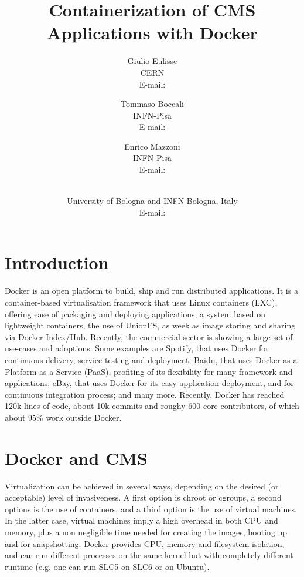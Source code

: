 \documentclass{PoS}
\title{Containerization of CMS Applications with Docker}
\author{Giulio Eulisse\\
        CERN\\
        E-mail: \email{Giulio.Eulisse@cern.ch}}
\author{Tommaso Boccali\\
        INFN-Pisa\\
        E-mail: \email{Tommaso.Boccali@pi.infn.it}}
\author{Enrico Mazzoni\\
        INFN-Pisa\\
        E-mail: \email{enrico.mazzoni@pi.infn.it}}
\author{\speaker{Daniele Bonacorsi}\\
        University of Bologna and INFN-Bologna, Italy\\
        E-mail: \email{daniele.bonacorsi@unibo.it}}
\begin{document}
\section{Introduction}

Docker is an open platform to build, ship and run distributed applications. It is a container-based virtualisation framework that uses Linux containers (LXC), offering ease of packaging and deploying applications, a system based on lightweight containers, the use of UnionFS, as week as image storing and sharing via Docker Index/Hub. Recently, the commercial sector is showing a large set of use-cases and adoptions. Some examples are Spotify, that uses Docker for continuous delivery, service testing and deployment; Baidu, that uses Docker as a Platform-as-a-Service (PaaS), profiting of its flexibility for many framework and applications; eBay, that uses Docker for its easy application deployment, and for continuous integration process; and many more. Recently, Docker has reached 120k lines of code, about 10k commits and roughy 600 core contributors, of which about 95\% work outside Docker.

\section{Docker and CMS}

Virtualization can be achieved in several ways, depending on the desired (or acceptable) level of invasiveness. A first option is chroot or cgroups, a second options is the use of containers, and a third option is the use of virtual machines. In the latter case, virtual machines imply a high overhead in both CPU and memory, plus a non negligible time needed for creating the images, booting up and for snapshotting. Docker provides CPU, memory and filesystem isolation, and can run different processes on the same kernel but with completely different runtime (e.g. one can run SLC5 on SLC6 or on Ubuntu).
\end{document}
